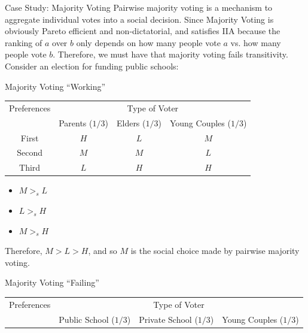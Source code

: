 \documentclass[10pt]{extarticle}
\begin{document}
  \begin{problem}{Case Study: Majority Voting}
    Pairwise majority voting is a mechanism to aggregate individual votes into a social decision. Since Majority Voting is obviously Pareto efficient and non-dictatorial, and satisfies IIA because the ranking of $a$ over $b$ only depends on how many people vote $a$ vs. how many people vote $b$. Therefore, we must have that majority voting fails transitivity.\\

    Consider an election for funding public schools:
    \begin{problem}{Majority Voting ``Working''}
      \begin{center}
        \renewcommand{\arraystretch}{1.5}
        \begin{tabular}{c|c|c|c|}
          \multicolumn{1}{c}{Preferences} & \multicolumn{3}{c}{Type of Voter}\\
          \cline{2-4}
                                          & Parents ($1/3$) & Elders ($1/3$) & Young Couples ($1/3$)\\
          \cline{2-4}
          First & $H$ & $L$ & $M$\\
          \cline{2-4}
          Second & $M$ & $M$ & $L$\\
          \cline{2-4}
          Third & $L$ & $H$ & $H$\\
          \cline{2-4}
        \end{tabular}
      \end{center}
      \begin{itemize}
        \item $M>_s L$
        \item $L >_s H$
        \item $M >_s H$
      \end{itemize}
      Therefore, $M>L>H$, and so $M$ is the social choice made by pairwise majority voting.
    \end{problem}
    \begin{problem}{Majority Voting ``Failing''}
      \begin{center}
        \renewcommand{\arraystretch}{1.5}
        \begin{tabular}{c|c|c|c|}
          \multicolumn{1}{c}{Preferences} & \multicolumn{3}{c}{Type of Voter}\\
          \cline{2-4}
                                          & Public School ($1/3$) & Private School ($1/3$) & Young Couples ($1/3$)\\

\end{tabular}
\end{center}
\end{problem}
\end{problem}
\end{document}
